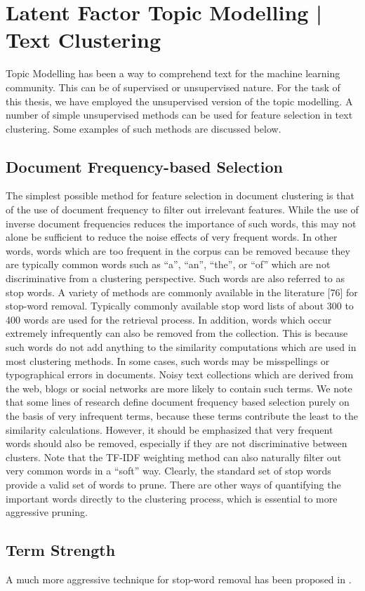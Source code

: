 \chapter{Latent Factor Topic Modelling | Text Clustering}

Topic Modelling has been a way to comprehend text for the machine learning community. This can be of supervised or unsupervised nature. For the task of this thesis, we have employed the unsupervised version of the topic modelling. A number of simple unsupervised methods can be used for feature selection in text clustering. Some examples of such methods are discussed below.

\section{Document Frequency-based Selection}
The simplest possible method for feature selection in document clustering is that of the use of document frequency to filter out irrelevant features. While the use of inverse document frequencies reduces the importance of such words, this may not alone be sufficient to reduce the noise effects of very frequent words. In other words, words which are too frequent in the corpus can be removed because they are typically common words such as “a”, “an”, “the”, or “of” which are not discriminative from a clustering perspective. Such words are also referred to as stop words.
A variety of methods are commonly available in the literature [76] for stop-word removal.  Typically commonly available stop word lists of
about 300 to 400 words are used for the retrieval process. In addition,
words which occur extremely infrequently can also be removed from
the collection. This is because such words do not add anything to the
similarity computations which are used in most clustering methods. In some cases, such words may be misspellings or typographical errors in
documents. Noisy text collections which are derived from the web, blogs
or social networks are more likely to contain such terms. We note that
some lines of research define document frequency based selection purely
on the basis of very infrequent terms, because these terms contribute the
least to the similarity calculations. However, it should be emphasized
that very frequent words should also be removed, especially if they are
not discriminative between clusters. Note that the TF-IDF weighting
method can also naturally filter out very common words in a “soft” way.
Clearly, the standard set of stop words provide a valid set of words to
prune. There are other ways of quantifying the important words directly to the clustering process, which is essential to more aggressive pruning.

\section{Term Strength}
A much more aggressive technique for stop-word removal has been proposed in \cite{Wilbur1992}.





